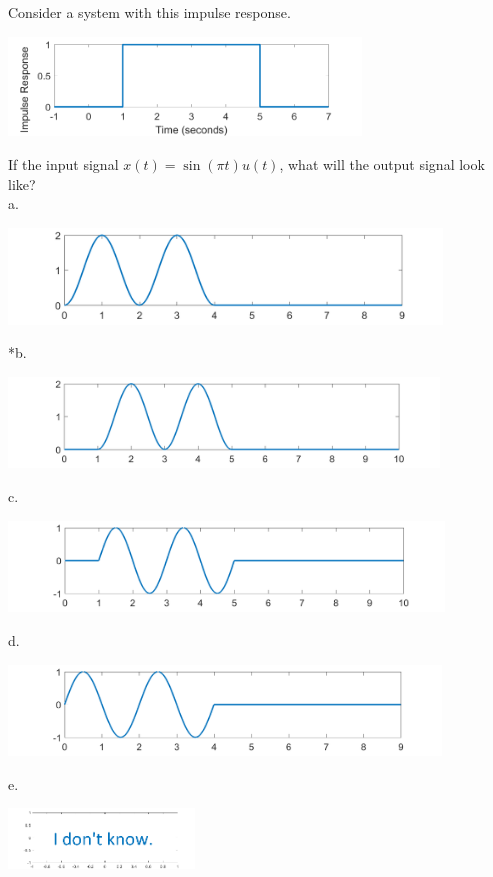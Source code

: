 
Consider a system with this impulse response.

\includegraphics[width=3.68486in,height=1.0394in]{../../Images/ConvolutionQ4.png}

If the input signal \(x\left( t \right) = \sin\left( \pi t \right)u(t)\), what will the
output signal look like?\\

a. 

\includegraphics[width=4.53492in,height=1.01189in]{../../Images/ConvolutionQ4a.png}

*b. 

\includegraphics[width=4.49878in,height=0.9505in]{../../Images/ConvolutionQ4b.png}

c. 

\includegraphics[width=4.55494in,height=0.95832in]{../../Images/ConvolutionQ4c.png}

d. 

\includegraphics[width=4.52014in,height=0.951in]{../../Images/ConvolutionQ4d.png}

e. 

\includegraphics[width=1.94778in,height=0.63207in]{../../Images/AnswerEGraph.png}\\
